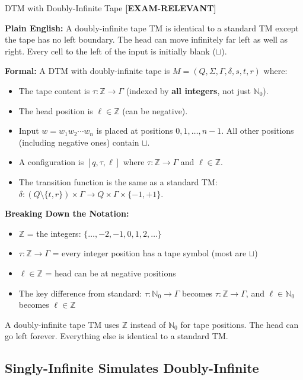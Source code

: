 \documentclass[11pt,a4paper]{article}
\newcommand{\kemark}{\textcolor{red!70!black}{\textbf{[EXAM-RELEVANT]}}}
\newcommand{\kt}[1]{\par\vspace{0.3em}\colorbox{yellow!60}{\parbox{\dimexpr\linewidth-2\fboxsep}{#1}}\vspace{0.3em}}
\begin{document}
\begin{definitionbox}{DTM with Doubly-Infinite Tape \kemark}

\textbf{Plain English:}
A doubly-infinite tape TM is identical to a standard TM except the tape has no left boundary. The head can move infinitely far left as well as right. Every cell to the left of the input is initially blank ($\sqcup$).

\textbf{Formal:}
A DTM with doubly-infinite tape is $M = (Q, \Sigma, \Gamma, \delta, s, t, r)$ where:
\begin{itemize}[nosep]
\item The tape content is $\tau: \mathbb{Z} \to \Gamma$ (indexed by \textbf{all integers}, not just $\mathbb{N}_0$).
\item The head position is $\ell \in \mathbb{Z}$ (can be negative).
\item Input $w = w_1 w_2 \cdots w_n$ is placed at positions $0, 1, \ldots, n-1$. All other positions (including negative ones) contain $\sqcup$.
\item A configuration is $[q, \tau, \ell]$ where $\tau: \mathbb{Z} \to \Gamma$ and $\ell \in \mathbb{Z}$.
\item The transition function is the same as a standard TM: $\delta: (Q \setminus \{t,r\}) \times \Gamma \to Q \times \Gamma \times \{-1, +1\}$.
\end{itemize}

\textbf{Breaking Down the Notation:}
\begin{itemize}[nosep]
\item $\mathbb{Z}$ = the integers: $\{\ldots, -2, -1, 0, 1, 2, \ldots\}$
\item $\tau: \mathbb{Z} \to \Gamma$ = every integer position has a tape symbol (most are $\sqcup$)
\item $\ell \in \mathbb{Z}$ = head can be at negative positions
\item The key difference from standard: $\tau: \mathbb{N}_0 \to \Gamma$ becomes $\tau: \mathbb{Z} \to \Gamma$, and $\ell \in \mathbb{N}_0$ becomes $\ell \in \mathbb{Z}$
\end{itemize}

\kt{A doubly-infinite tape TM uses $\mathbb{Z}$ instead of $\mathbb{N}_0$ for tape positions. The head can go left forever. Everything else is identical to a standard TM.}
\end{definitionbox}

\subsection{Singly-Infinite Simulates Doubly-Infinite}
\end{document}
